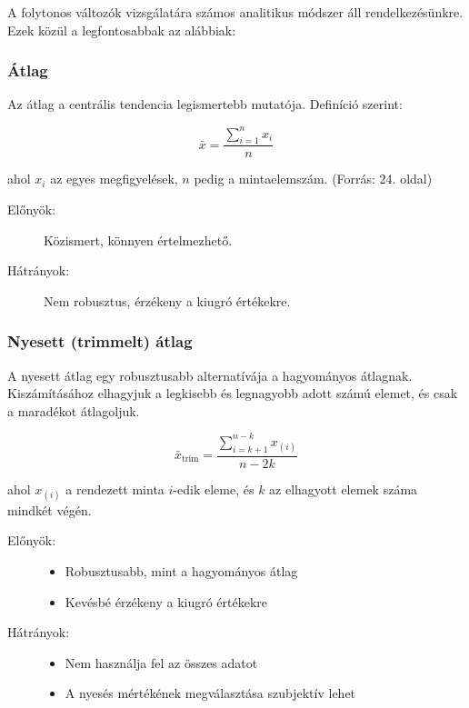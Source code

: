 \documentclass[a4paper,12pt]{article}
\begin{document}
    A folytonos változók vizsgálatára számos analitikus módszer áll rendelkezésünkre. Ezek közül a legfontosabbak az alábbiak:

    \subsubsection{Átlag}

    Az átlag a centrális tendencia legismertebb mutatója. Definíció szerint:

    \begin{equation}
        \bar{x} = \frac{\sum_{i=1}^n x_i}{n}
    \end{equation}

    ahol $x_i$ az egyes megfigyelések, $n$ pedig a mintaelemszám.
    (Forrás: 24. oldal)

    \begin{description}
        \item[Előnyök:] Közismert, könnyen értelmezhető.
        \item[Hátrányok:] Nem robusztus, érzékeny a kiugró értékekre.
    \end{description}

    \subsubsection{Nyesett (trimmelt) átlag}

    A nyesett átlag egy robusztusabb alternatívája a hagyományos átlagnak. Kiszámításához elhagyjuk a legkisebb és legnagyobb adott számú elemet, és csak a maradékot átlagoljuk.

    \begin{equation}
        \bar{x}_{\text{trim}} = \frac{\sum_{i=k+1}^{n-k} x_{(i)}}{n-2k}
    \end{equation}

    ahol $x_{(i)}$ a rendezett minta $i$-edik eleme, és $k$ az elhagyott elemek száma mindkét végén.

    \begin{description}
        \item[Előnyök:]
        \begin{itemize}
            \item Robusztusabb, mint a hagyományos átlag
            \item Kevésbé érzékeny a kiugró értékekre
        \end{itemize}
        \item[Hátrányok:]
        \begin{itemize}
            \item Nem használja fel az összes adatot
            \item A nyesés mértékének megválasztása szubjektív lehet
        \end{itemize}
    \end{description}
\end{document}
